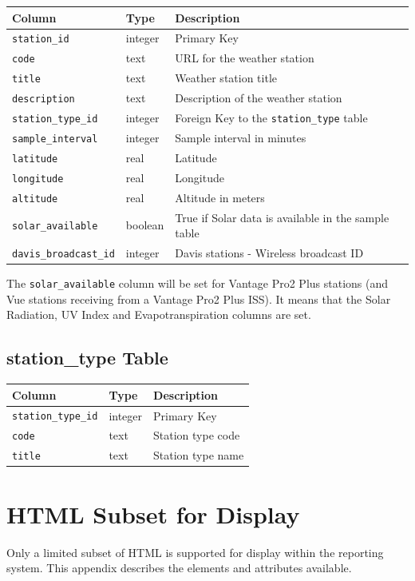 \documentclass[a4paper,10pt]{book}
\begin{document}
\begin{tabular}{p{3.5cm} p{1.3cm} l}
\hline
\textbf{Column} & \textbf{Type} & \textbf{Description} \\
\hline
\verb|station_id| & integer & Primary Key\\
\verb|code| & text & URL for the weather station  \\
\verb|title| & text & Weather station title\\
\verb|description| & text & Description of the weather station\\
\verb|station_type_id| & integer & Foreign Key to the \verb|station_type| table\\
\verb|sample_interval| & integer & Sample interval in minutes\\
\verb|latitude| & real & Latitude\\
\verb|longitude| & real & Longitude\\
\verb|altitude| & real & Altitude in meters\\
\verb|solar_available| & boolean & True if Solar data is available in the sample table\\
\verb|davis_broadcast_id| & integer & Davis stations - Wireless broadcast ID\\
\hline
\end{tabular}

The \verb|solar_available| column will be set for Vantage Pro2 Plus stations (and Vue stations receiving from a Vantage Pro2 Plus ISS). It means that the Solar Radiation, UV Index and Evapotranspiration columns are set.

\section{station\_type Table}
\begin{tabular}{p{3cm} p{2.5cm} l}
\hline
\textbf{Column} & \textbf{Type} & \textbf{Description} \\
\hline
\verb|station_type_id| & integer & Primary Key\\
\verb|code| & text & Station type code\\
\verb|title| & text & Station type name\\
\hline
\end{tabular}




\chapter{HTML Subset for Display}
\label{app_html_subset}
Only a limited subset of HTML is supported for display within the reporting system. This appendix describes the elements and attributes available.
\end{document}
